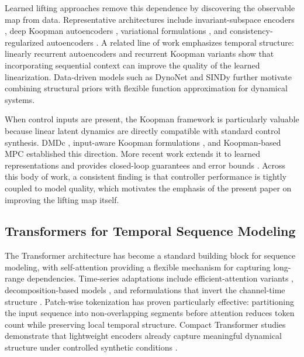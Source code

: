 \documentclass[journal]{IEEEtran}
\begin{document}
Learned lifting approaches remove this dependence by discovering the observable map from data. Representative architectures include invariant-subspace encoders \cite{takeishi2017koopman}, deep Koopman autoencoders \cite{lusch2018deep, yeung2019learning}, variational formulations \cite{morton2019deep, yuan2022variational}, and consistency-regularized autoencoders \cite{azencot2020forecasting}. A related line of work emphasizes temporal structure: linearly recurrent autoencoders \cite{otto2019linearly} and recurrent Koopman variants \cite{rank2019recurrent} show that incorporating sequential context can improve the quality of the learned linearization. Data-driven models such as DynoNet \cite{forgione2021dynonet} and SINDy \cite{brunton2016sindy} further motivate combining structural priors with flexible function approximation for dynamical systems.

When control inputs are present, the Koopman framework is particularly valuable because linear latent dynamics are directly compatible with standard control synthesis. DMDc \cite{proctor2016dmdc}, input-aware Koopman formulations \cite{proctor2018generalizing, brunton2016invariant}, and Koopman-based MPC \cite{korda2018linear} established this direction. More recent work extends it to learned representations \cite{han2020deep, shi2022deep} and provides closed-loop guarantees and error bounds \cite{strasser2026overview, duran2025control}. Across this body of work, a consistent finding is that controller performance is tightly coupled to model quality, which motivates the emphasis of the present paper on improving the lifting map itself.

\subsection{Transformers for Temporal Sequence Modeling}

The Transformer architecture \cite{vaswani2017attention} has become a standard building block for sequence modeling, with self-attention providing a flexible mechanism for capturing long-range dependencies. Time-series adaptations include efficient-attention variants \cite{zhou2021informer, wang2020linformer, katharopoulos2020transformers, choromanski2021performer}, decomposition-based models \cite{wu2021autoformer, zhou2022fedformer}, and reformulations that invert the channel-time structure \cite{zeng2023transformers, liu2024itransformer}. Patch-wise tokenization \cite{nie2023time} has proven particularly effective: partitioning the input sequence into non-overlapping segments before attention reduces token count while preserving local temporal structure. Compact Transformer studies demonstrate that lightweight encoders already capture meaningful dynamical structure under controlled synthetic conditions \cite{forootani2026compact, forootani2025synthetic}.
\end{document}
